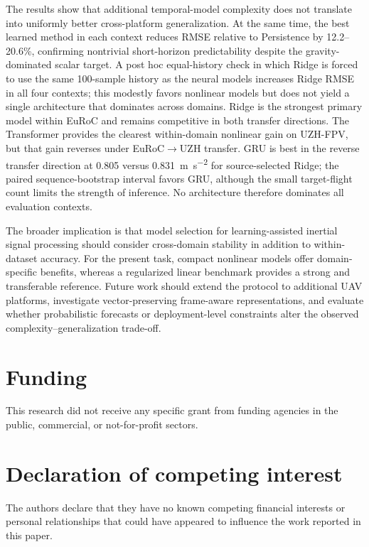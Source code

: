 \documentclass[preprint,12pt]{elsarticle}
\begin{document}
The results show that additional temporal-model complexity does not translate into uniformly better cross-platform generalization. At the same time, the best learned method in each context reduces RMSE relative to Persistence by 12.2--20.6\%, confirming nontrivial short-horizon predictability despite the gravity-dominated scalar target. A post hoc equal-history check in which Ridge is forced to use the same 100-sample history as the neural models increases Ridge RMSE in all four contexts; this modestly favors nonlinear models but does not yield a single architecture that dominates across domains. Ridge is the strongest primary model within EuRoC and remains competitive in both transfer directions. The Transformer provides the clearest within-domain nonlinear gain on UZH-FPV, but that gain reverses under EuRoC$\rightarrow$UZH transfer. GRU is best in the reverse transfer direction at 0.805 versus 0.831~\si{\metre\per\second\squared} for source-selected Ridge; the paired sequence-bootstrap interval favors GRU, although the small target-flight count limits the strength of inference. No architecture therefore dominates all evaluation contexts.

The broader implication is that model selection for learning-assisted inertial signal processing should consider cross-domain stability in addition to within-dataset accuracy. For the present task, compact nonlinear models offer domain-specific benefits, whereas a regularized linear benchmark provides a strong and transferable reference. Future work should extend the protocol to additional UAV platforms, investigate vector-preserving frame-aware representations, and evaluate whether probabilistic forecasts or deployment-level constraints alter the observed complexity--generalization trade-off.

\section*{Funding}
This research did not receive any specific grant from funding agencies in the public, commercial, or not-for-profit sectors.

\section*{Declaration of competing interest}
The authors declare that they have no known competing financial interests or personal relationships that could have appeared to influence the work reported in this paper.
\end{document}
